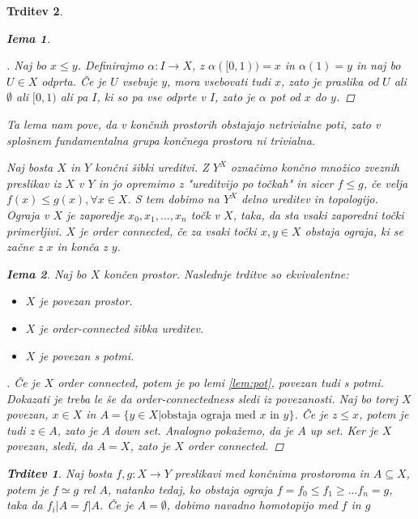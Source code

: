 \documentclass[a4paper,12pt]{article}
\theoremstyle{definition}
\theoremstyle{plain}
\theoremstyle{definition}
\theoremstyle{plain}
\newtheorem{trditev}{Trditev}
\theoremstyle{plain}
\theoremstyle{plain}
\theoremstyle{plain}
\newtheorem{lema}{Iema}
\newenvironment{dokaz}{\begin{proof}[\bfseries\upshape\proofname]}{\end{proof}}
\begin{document}
\begin{trditev}
\begin{lema}
\end{lema}
\begin{dokaz}
    Naj bo $x \leq y$. Definirajmo $\alpha:I\rightarrow X$, z $\alpha([0,1))=x$ in $\alpha(1)=y$ in naj bo $U\in X$ odprta. Če je $U$ vsebuje $y$, mora vsebovati tudi $x$, 
    zato je praslika od $U$ ali $\emptyset$ ali $[0,1)$ ali pa $I$, ki so pa vse odprte v $I$, zato je $\alpha$ pot od $x$ do $y$.
\end{dokaz}
Ta lema nam pove, da v končnih prostorih obstajajo netrivialne poti, zato v splošnem fundamentalna grupa končnega prostora ni trivialna.

Naj bosta $X$ in $Y$ končni šibki ureditvi. Z $Y^X$ označimo končno množico zveznih preslikav iz $X$ v $Y$ in jo opremimo z "ureditvijo po točkah" in sicer $f\leq g$, če velja $f(x) \leq g(x), \forall x\in X$. S tem dobimo na $Y^X$ delno ureditev in topologijo. \textit{Ograja} v $X$ je zaporedje $x_0,x_1,...,x_n$ točk v $X$, taka, da sta vsaki zaporedni točki primerljivi. $X$ je \textit{order 
connected}, če za vsaki točki $x,y\in X$ obstaja ograja, ki se začne z $x$ in konča z $y$.
\begin{lema}
    Naj bo $X$ končen prostor. Naslednje trditve so ekvivalentne:

    \begin{itemize}
        \label{lem:povezanost}
        \item $X$ je povezan prostor.
        \item $X$ je order-connected šibka ureditev.
        \item $X$ je povezan s potmi.
    \end{itemize}
\end{lema}


\begin{dokaz}
    Če je $X$ order connected, potem je po lemi \ref{lem:pot}, povezan tudi s potmi.
    Dokazati je treba le še da order-connectedness sledi iz povezanosti. Naj bo torej $X$ povezan, $x\in X$ in $A=\{y\in X| \text{obstaja ograja med $x$ in $y$}\}$. Če 
    je $z\leq x$, potem je tudi $z\in A$, zato je $A$ down set. Analogno pokažemo, da je $A$ up set. Ker je $X$ povezan, sledi, da $A=X$, zato je $X$ order connected.
\end{dokaz}

\begin{trditev}
    \label{iz:ograje}
Naj bosta $f,g: X\rightarrow Y$ preslikavi med končnima prostoroma in $A\subseteq X$, potem je $f\simeq g$ rel $A$, natanko tedaj, ko obstaja ograja $f=f_0\leq f_1\geq ... f_n=g$, taka da $f_i|A=f|A$. Če je $A=\emptyset$, dobimo navadno homotopijo med $f$ in $g$
\end{trditev}


\end{trditev}
\end{document}
